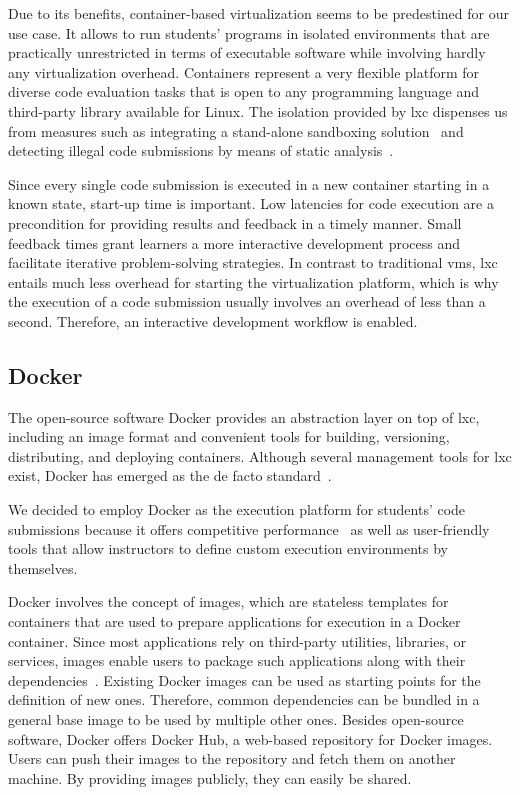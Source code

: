 Due to its benefits, container-based virtualization seems to be predestined for our use case. It allows to run students' programs in isolated environments that are practically unrestricted in terms of executable software while involving hardly any virtualization overhead. Containers represent a very flexible platform for diverse code evaluation tasks that is open to any programming language and third-party library available for Linux. The isolation provided by \gls{lxc} dispenses us from measures such as integrating a stand-alone sandboxing solution~\cite{ihantola2010review} and detecting illegal code submissions by means of static analysis~\cite{staubitz2009mini}.

Since every single code submission is executed in a new container starting in a known state, start-up time is important. Low latencies for code execution are a precondition for providing results and feedback in a timely manner. Small feedback times grant learners a more interactive development process and facilitate iterative problem-solving strategies. In contrast to traditional \glspl{vm}, \gls{lxc} entails much less overhead for starting the virtualization platform, which is why the execution of a code submission usually involves an overhead of less than a second. Therefore, an interactive development workflow is enabled.

\subsection{Docker}

The open-source software Docker provides an abstraction layer on top of \gls{lxc}, including an image format and convenient tools for building, versioning, distributing, and deploying containers. Although several management tools for \gls{lxc} exist, Docker has emerged as the de facto standard~\cite{felter28updated}.

We decided to employ Docker as the execution platform for students' code submissions because it offers competitive performance~\cite{felter28updated} as well as user-friendly tools that allow instructors to define custom execution environments by themselves.

Docker involves the concept of images, which are stateless templates for containers that are used to prepare applications for execution in a Docker container. Since most applications rely on third-party utilities, libraries, or services, images enable users to package such applications along with their dependencies~\cite{merkel2014lightweight}. Existing Docker images can be used as starting points for the definition of new ones. Therefore, common dependencies can be bundled in a general base image to be used by multiple other ones. Besides open-source software, Docker offers Docker Hub, a web-based repository for Docker images. Users can push their images to the repository and fetch them on another machine. By providing images publicly, they can easily be shared.

